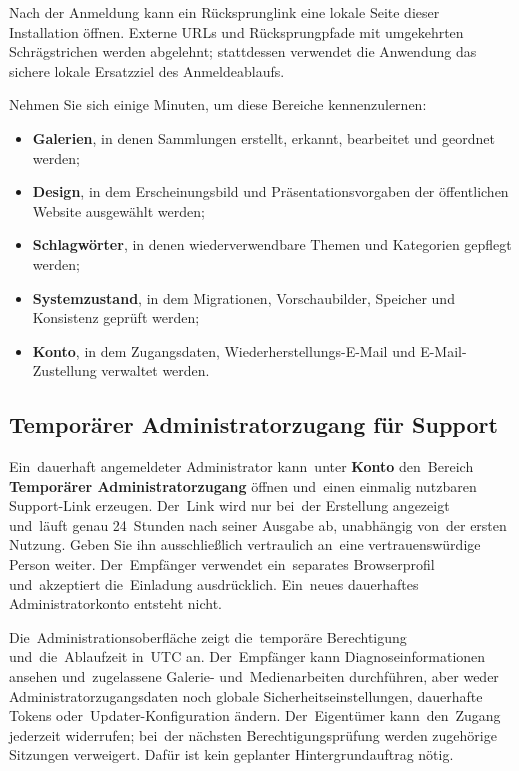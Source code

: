 \documentclass[11pt,a4paper]{article}
\newcommand{\ui}[1]{\textbf{#1}}
\begin{document}
Nach der Anmeldung kann ein Rücksprunglink eine lokale Seite dieser Installation
öffnen. Externe URLs und Rücksprungpfade mit umgekehrten Schrägstrichen werden
abgelehnt; stattdessen verwendet die Anwendung das sichere lokale Ersatzziel des
Anmeldeablaufs.

Nehmen Sie sich einige Minuten, um diese Bereiche kennenzulernen:

\begin{itemize}
  \item \ui{Galerien}, in denen Sammlungen erstellt, erkannt, bearbeitet und
  geordnet werden;
  \item \ui{Design}, in dem Erscheinungsbild und Präsentationsvorgaben der
  öffentlichen Website ausgewählt werden;
  \item \ui{Schlagwörter}, in denen wiederverwendbare Themen und Kategorien
  gepflegt werden;
  \item \ui{Systemzustand}, in dem Migrationen, Vorschaubilder, Speicher und
  Konsistenz geprüft werden;
  \item \ui{Konto}, in dem Zugangsdaten, Wieder\-her\-stel\-lungs-E-Mail und
  E-Mail-Zustellung verwaltet werden.
\end{itemize}

\subsection{Temporärer Administratorzugang für Support}

Ein~dauerhaft angemeldeter Administrator kann~unter \ui{Konto} den~Bereich
\ui{Temporärer Administratorzugang} öffnen und~einen einmalig nutzbaren
Support-Link erzeugen. Der~Link wird nur bei~der Erstellung angezeigt und~läuft
genau 24~Stunden nach seiner Ausgabe ab, unabhängig von~der ersten Nutzung.
Geben Sie ihn ausschließlich vertraulich an~eine vertrauenswürdige Person
weiter. Der~Empfänger verwendet ein~separates Browserprofil und~akzeptiert
die~Einladung ausdrücklich. Ein~neues dauerhaftes Administratorkonto entsteht
nicht.

Die~Administrationsoberfläche zeigt die~temporäre Berechtigung
und~die~Ablaufzeit in~UTC an. Der~Empfänger kann Diagnoseinformationen ansehen
und~zugelassene Galerie- und~Medienarbeiten durchführen, aber weder
Administratorzugangsdaten noch globale Sicherheitseinstellungen, dauerhafte
Tokens oder~Updater-Konfiguration ändern. Der~Eigentümer kann~den~Zugang
jederzeit widerrufen; bei~der nächsten Berechtigungsprüfung werden zugehörige
Sitzungen verweigert. Dafür ist kein geplanter Hintergrundauftrag nötig.
\end{document}
